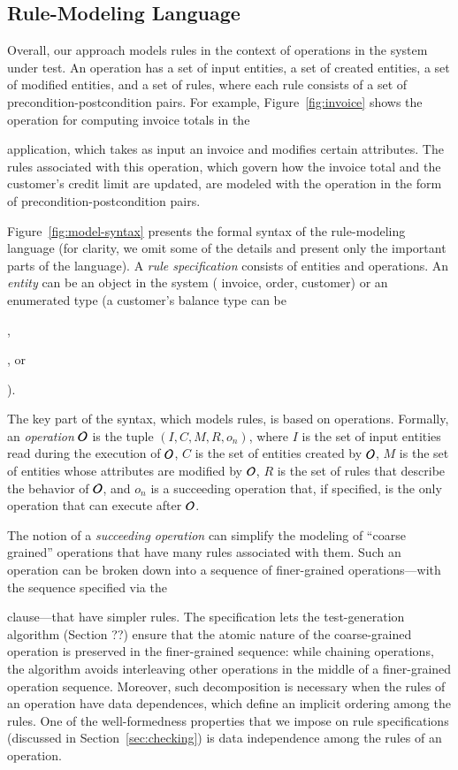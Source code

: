 \subsection{Rule-Modeling Language}

Overall, our approach models rules in the context of operations in the system
under test.  An operation has a set of input entities, a set of created
entities, a set of modified entities, and a set of rules, where each rule
consists of a set of precondition-postcondition pairs. For example,
Figure~\ref{fig:invoice} shows the operation for computing invoice totals in the
\subject{jBilling} application, which takes as input an invoice and modifies
certain attributes. The rules associated with this operation, which govern how
the invoice total and the customer's credit limit are updated, are modeled with
the operation in the form of precondition-postcondition pairs.

Figure~\ref{fig:model-syntax} presents the formal syntax of the rule-modeling
language (for clarity, we omit some of the details and present only the
important parts of the language). A \textit{rule specification} consists of
entities and operations. An \textit{entity} can be an object in the system (\eg
invoice, order, customer) or an enumerated type (\eg a customer's balance type
can be \subject{None}, \subject{Credit}, or \subject{Prepaid}).

The key part of the syntax, which models rules, is based on
operations. Formally, an \textit{operation} ${\cal O}$ is the tuple $(I, C, M,
R, o_n)$, where $I$ is the set of input entities read during the execution of
${\cal O}$, $C$ is the set of entities created by ${\cal O}$, $M$ is the set of
entities whose attributes are modified by ${\cal O}$, $R$ is the set of rules
that describe the behavior of ${\cal O}$, and $o_n$ is a succeeding operation
that, if specified, is the only operation that can execute after ${\cal O}$.

The notion of a \textit{succeeding operation} can simplify the modeling of
``coarse grained'' operations that have many rules associated with them. Such an
operation can be broken down into a sequence of finer-grained operations---with
the sequence specified via the \subject{next} clause---that have simpler
rules. The specification lets the test-generation algorithm (Section ??) ensure
that the atomic nature of the coarse-grained operation is preserved in the
finer-grained sequence: while chaining operations, the algorithm avoids
interleaving other operations in the middle of a finer-grained operation
sequence.  Moreover, such decomposition is necessary when the rules of an
operation have data dependences, which define an implicit ordering among the
rules. One of the well-formedness properties that we impose on rule
specifications (discussed in Section~\ref{sec:checking}) is data independence
among the rules of an operation.

